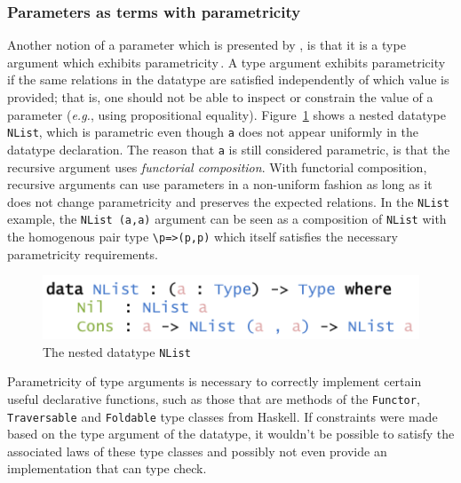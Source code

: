 \documentclass{ituthesis}
\newcommand{\tttype}[1]{\textcolor{type-color}{\texttt{#1}}}
\newcommand{\ttvar}[1]{\textcolor{local-var-color}{\texttt{#1}}}
\theoremstyle{break}
\begin{document}
\subsubsection{Parameters as terms with parametricity}
\label{ssub:Parameters as terms with parametricity}
Another notion of a parameter which is presented by \textcite{bernardy2010parametricity}, is that it is a type argument which exhibits parametricity\,\autocite{DBLP:conf/ifip/Reynolds83,Wadler89theoremsfor}.
A type argument exhibits parametricity if the same relations in the datatype are satisfied independently of which value is provided; that is, one should not be able to inspect or constrain the value of a parameter (\textit{e.g.}, using propositional equality).
Figure~\ref{fig:nestedlist} shows a nested datatype\,\autocite{bird1998nested} \tttype{NList}, which is parametric even though \ttvar{a} does not appear uniformly in the datatype declaration.
The reason that \ttvar{a} is still considered parametric, is that the recursive argument uses \textit{functorial composition}.
With functorial composition, recursive arguments can use parameters in a non-uniform fashion as long as it does not change parametricity and preserves the expected relations.
In the \tttype{NList} example, the \tttype{NList}~\tttype{(}\ttvar{a}\tttype{,}\ttvar{a}\tttype{)} argument can be seen as a composition of \tttype{NList} with the homogenous pair type \texttt{\textbackslash}\ttvar{p}\texttt{=>}\tttype{(}\ttvar{p}\tttype{,}\ttvar{p}\tttype{)} which itself satisfies the necessary parametricity requirements.

\begin{figure}[ht]
\begin{center}
    \includegraphics[scale=0.5]{Figures/NestedList.png}
\end{center}
\caption{The nested datatype \tttype{NList}}
\label{fig:nestedlist}
\end{figure}

Parametricity of type arguments is necessary to correctly implement certain useful declarative functions, such as those that are methods of the \tttype{Functor}, \tttype{Traversable} and \tttype{Foldable} type classes from Haskell.
If constraints were made based on the type argument of the datatype, it wouldn't be possible to satisfy the associated laws of these type classes and possibly not even provide an implementation that can type check.
\end{document}
